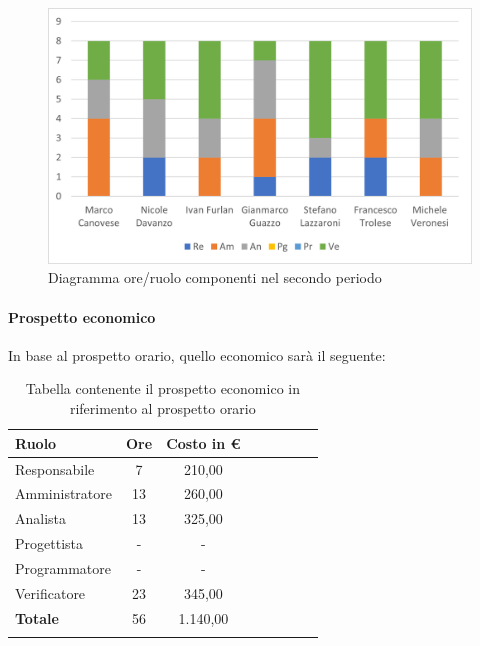 \begin{figure}[H]
	\centering
	\includegraphics[width=0.8\linewidth]{res/images/preventivo/dettaglio_analisi/2-1.png}
	\caption{Diagramma ore/ruolo componenti nel secondo periodo}
	\label{fig:diagramma suddivisione ruoli secondo periodo analisi}
\end{figure}

\paragraph{Prospetto economico}
In base al prospetto orario, quello economico sarà il seguente:

\begin{longtable}{|l|c|c|c|c|c|c|c|}
	\hline
	\rowcolor{lighter-grayer}
	\textbf{Ruolo}  & \textbf{Ore} & \textbf{Costo in €} \\
	\hline
	\endfirsthead

	\hline
	Responsabile    & 7            & 210,00              \\
	\hline
	\hline
	Amministratore  & 13           & 260,00              \\
	\hline
	\hline
	Analista        & 13           & 325,00              \\
	\hline
	\hline
	Progettista     & -            & -                   \\
	\hline
	\hline
	Programmatore   & -            & -                   \\
	\hline
	\hline
	Verificatore    & 23           & 345,00              \\
	\hline
	\hline
	\textbf{Totale} & 56           & 1.140,00            \\
	\hline
	\rowcolor{white}
	\caption{Tabella contenente il prospetto economico in riferimento al prospetto orario}
\end{longtable}
\pagebreak

